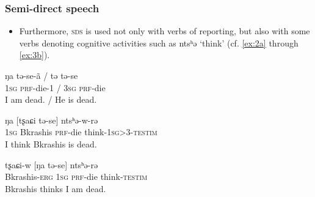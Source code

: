 \documentclass[xcolor=table]{beamer}
\newcommand{\ipa}[1]{{\phon #1}} %
\newcommand{\ipapl}[1]{{\phondroit #1}}
\newcommand{\const}{\textsc{testim}}
\newcommand{\erg}{\textsc{erg}}
\newcommand{\inv}{\textsc{inv}}
\newcommand{\prf}{\textsc{prf}}
\newcommand{\sg}{\textsc{sg}}
\begin{document}
\begin{frame}%
\frametitle{Semi-direct speech}

\begin{itemize}

\item Furthermore, \textsc{sds} is used not only with verbs of reporting, but also with some verbs denoting cognitive activities such as \ipa{ntsʰə} `think' (cf. \ref{ex:2a} through \ref{ex:3b}).
\end{itemize}

\begin{exe}
\ex
\begin{xlist}
\ex \label{ex:2a}
\gll
	\ipa{ŋa} \ipa{tə-se-ã} / \ipa{tə} \ipa{tə-se}\\
	{1\sg}  {\prf-die-1} / {3\sg}  {\prf-die}\\ 
	\glt I am dead. / He is dead.

\ex \label{ex:2b}
\gll
	\ipa{ŋa} [\ipapl{tʂaɕi} \ipapl{tə-se}] \ipa{ntsʰə-w-rə}  \\
	{1\sg} {Bkrashis} {\prf-die} {think-1\sg>3-\const}\\ 
	\glt I think Bkrashis is dead.

\ex \label{ex:2c}
\gll
	\ipa{tʂaɕi-w} [\ipapl{ŋa} \ipapl{tə-se}] \ipa{ntsʰə-rə}  \\
	{Bkrashis-\erg} {1\sg} {\prf-die} {think-\const}\\ 
	\glt Bkrashis thinks I am dead.


\end{xlist}
\end{exe}

\end{frame}
\end{document}
